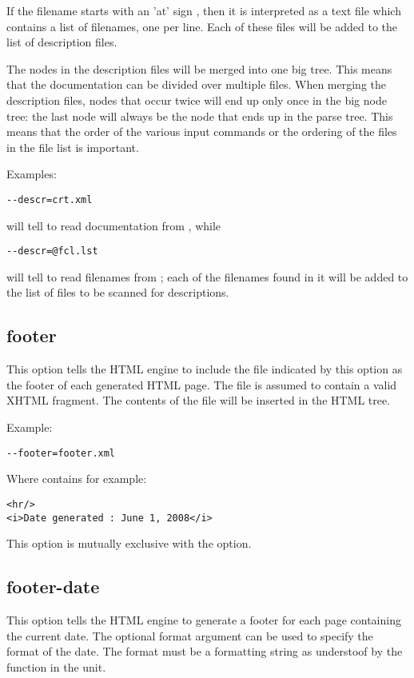 If the filename starts with an 'at' sign , then it is interpreted
as a text file which contains a list of filenames, one per line. 
Each of these files will be added to the list of description files.

The nodes in the description files will be merged into one big tree. This
means that the documentation can be divided over multiple files. When
merging the description files, nodes that occur twice will end up only once
in the big node tree: the last node will always be the node that ends up in
the parse tree. This means that the order of the various input commands or
the ordering of the files in the file list is important.

Examples:
\begin{verbatim}
--descr=crt.xml 
\end{verbatim}
will tell \fpdoc to read documentation from , while
\begin{verbatim}
--descr=@fcl.lst 
\end{verbatim}
will tell \fpdoc to read filenames from ; each of the
filenames found in it will be added to the list of files to be scanned for
descriptions.

\subsection{footer}
\label{suse:footer}
This option tells the HTML engine to include the file indicated by this
option as the footer of each generated HTML page. The file is assumed to
contain a valid XHTML fragment. The contents of the file will be inserted 
in the HTML tree.

Example:
\begin{verbatim}
--footer=footer.xml
\end{verbatim}
Where  contains for example:
\begin{verbatim}
<hr/>
<i>Date generated : June 1, 2008</i>
\end{verbatim}

This option is mutually exclusive with the  option.

\subsection{footer-date}
\label{suse:footerdate}
This option tells the HTML engine to generate a footer for each page
containing the current date. The optional format argument can be used
to specify the format of the date. The format must be a formatting string
as understoof by the  function in the  
unit.

